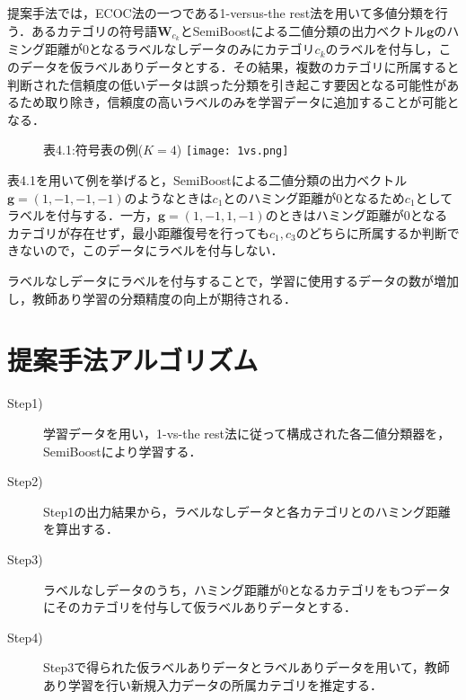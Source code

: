 提案手法では，ECOC法の一つである1-versus-the rest法を用いて多値分類を行う．あるカテゴリの符号語$\bm{W}_{c_k}$とSemiBoostによる二値分類の出力ベクトル$\bm{g}$のハミング距離が$0$となるラベルなしデータのみにカテゴリ$c_k$のラベルを付与し，このデータを仮ラベルありデータとする．その結果，複数のカテゴリに所属すると判断された信頼度の低いデータは誤った分類を引き起こす要因となる可能性があるため取り除き，信頼度の高いラベルのみを学習データに追加することが可能となる．

\begin{figure}[H]
\begin{center}
表4.1:符号表の例($K = 4$)
\label{4cate}
\texttt{[image: 1vs.png]}
\end{center}
\end{figure}\par

表4.1を用いて例を挙げると，SemiBoostによる二値分類の出力ベクトル$\bm{g}=({1}, {-1}, {-1}, {-1})$のようなときは$c_1$とのハミング距離が0となるため$c_1$としてラベルを付与する．一方，$\bm{g}=({1}, {-1}, {1}, {-1})$のときはハミング距離が0となるカテゴリが存在せず，最小距離復号を行っても$c_1, c_3$のどちらに所属するか判断できないので，このデータにラベルを付与しない．\par


ラベルなしデータにラベルを付与することで，学習に使用するデータの数が増加し，教師あり学習の分類精度の向上が期待される．\par


\section{提案手法アルゴリズム}
\label{sec:提案手法アルゴリズム}

\begin{description}
  \item[Step1)] 学習データを用い，1-vs-the rest法に従って構成された各二値分類器を，SemiBoostにより学習する．

  \item[Step2)]Step1の出力結果から，ラベルなしデータと各カテゴリとのハミング距離を算出する．

  \item[Step3)]ラベルなしデータのうち，ハミング距離が$0$となるカテゴリをもつデータにそのカテゴリを付与して仮ラベルありデータとする．

  \item[Step4)] Step3で得られた仮ラベルありデータとラベルありデータを用いて，教師あり学習を行い新規入力データの所属カテゴリを推定する．
\end{description}

